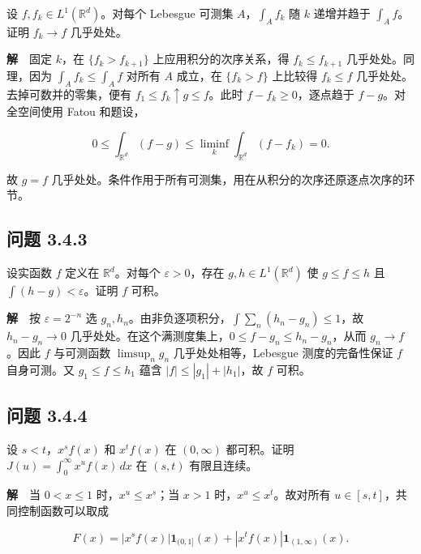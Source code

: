 \documentclass[11pt,a4paper]{article}
\begin{document}
设 \(f,f_k\in L^1(\mathbb R^d)\)。对每个 Lebesgue 可测集
\(A\)，\(\int_A f_k\) 随 \(k\) 递增并趋于 \(\int_A f\)。证明
\(f_k\to f\) 几乎处处。

\textbf{解}　固定 \(k\)，在 \(\{f_k>f_{k+1}\}\) 上应用积分的次序关系，得
\(f_k\le f_{k+1}\) 几乎处处。同理，因为 \(\int_A f_k\le\int_A f\) 对所有
\(A\) 成立，在 \(\{f_k>f\}\) 上比较得 \(f_k\le f\)
几乎处处。去掉可数并的零集，便有 \(f_1\le f_k\uparrow g\le f\)。此时
\(f-f_k\ge0\)，逐点趋于 \(f-g\)。对全空间使用 Fatou 和题设，

\begin{equation*}
0\le\int_{\mathbb R^d}(f-g)\le\liminf_k\int_{\mathbb R^d}(f-f_k)=0 .
\end{equation*}

故 \(g=f\)
几乎处处。条件作用于所有可测集，用在从积分的次序还原逐点次序的环节。

\subsection{问题 3.4.3}\label{ux95eeux9898-3.4.3}

设实函数 \(f\) 定义在 \(\mathbb R^d\)。对每个 \(\varepsilon>0\)，存在
\(g,h\in L^1(\mathbb R^d)\) 使 \(g\le f\le h\) 且
\(\int(h-g)<\varepsilon\)。证明 \(f\) 可积。

\textbf{解}　按 \(\varepsilon=2^{-n}\) 选
\(g_n,h_n\)。由非负逐项积分，\(\int\sum_n(h_n-g_n)\le1\)，故
\(h_n-g_n\to0\)
几乎处处。在这个满测度集上，\(0\le f-g_n\le h_n-g_n\)，从而
\(g_n\to f\)。因此 \(f\) 与可测函数 \(\limsup_n g_n\)
几乎处处相等，Lebesgue 测度的完备性保证 \(f\) 自身可测。又
\(g_1\le f\le h_1\) 蕴含 \(|f|\le|g_1|+|h_1|\)，故 \(f\) 可积。

\subsection{问题 3.4.4}\label{ux95eeux9898-3.4.4}

设 \(s<t\)，\(x^sf(x)\) 和 \(x^tf(x)\) 在 \((0,\infty)\) 都可积。证明
\(J(u)=\int_0^\infty x^uf(x)\,dx\) 在 \((s,t)\) 有限且连续。

\textbf{解}　当 \(0<x\le1\) 时，\(x^u\le x^s\)；当 \(x>1\)
时，\(x^u\le x^t\)。故对所有 \(u\in[s,t]\)，共同控制函数可以取成

\begin{equation*}
F(x)=|x^sf(x)|\mathbf1_{(0,1]}(x)+|x^tf(x)|\mathbf1_{(1,\infty)}(x).
\end{equation*}
\end{document}
